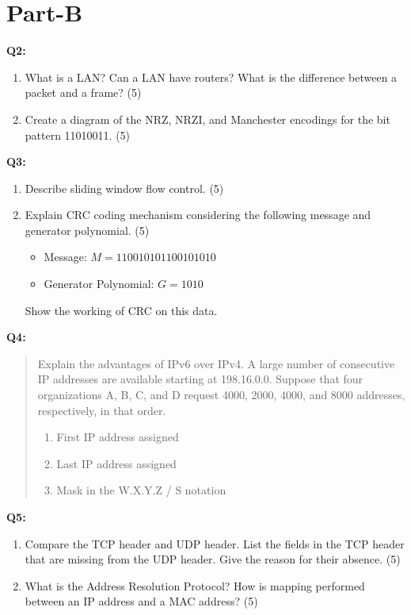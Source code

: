 \documentclass[a4paper,12pt]{article}
\begin{document}
\section*{Part-B}
\textbf{Q2:} 
\begin{enumerate}[label=(\alph*)]
    \item What is a LAN? Can a LAN have routers? What is the difference between a packet and a frame? \hfill (5)
    \item Create a diagram of the NRZ, NRZI, and Manchester encodings for the bit pattern 11010011. \hfill (5)
\end{enumerate}

\textbf{Q3:}
\begin{enumerate}[label=(\alph*)]
    \item Describe sliding window flow control. \hfill (5)
    \item Explain CRC coding mechanism considering the following message and generator polynomial. \hfill (5)
    \begin{itemize}
        \item Message: $M=110010101100101010$
        \item Generator Polynomial: $G=1010$
    \end{itemize}
    Show the working of CRC on this data.
\end{enumerate}

\textbf{Q4:}
\begin{quote}
    Explain the advantages of IPv6 over IPv4. A large number of consecutive IP addresses are available starting at 198.16.0.0. Suppose that four organizations A, B, C, and D request 4000, 2000, 4000, and 8000 addresses, respectively, in that order.  
    \begin{enumerate}[label=(\roman*)]
        \item First IP address assigned
        \item Last IP address assigned
        \item Mask in the W.X.Y.Z / S notation
    \end{enumerate}
\end{quote}

\textbf{Q5:}
\begin{enumerate}[label=(\alph*)]
    \item Compare the TCP header and UDP header. List the fields in the TCP header that are missing from the UDP header. Give the reason for their absence. \hfill (5)
    \item What is the Address Resolution Protocol? How is mapping performed between an IP address and a MAC address? \hfill (5)
\end{enumerate}
\end{document}
